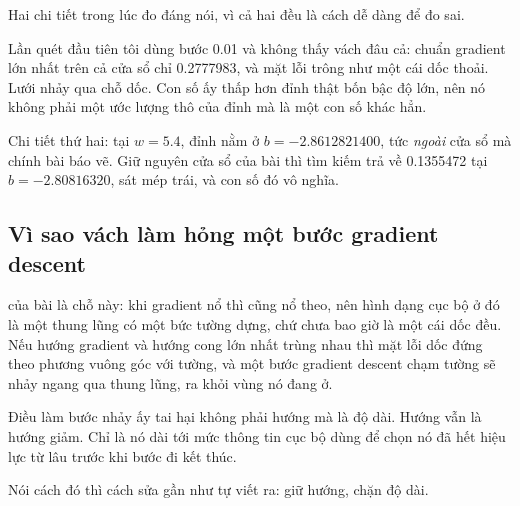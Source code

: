 Hai chi tiết trong lúc đo đáng nói, vì cả hai đều là cách dễ dàng để đo sai.

Lần quét đầu tiên tôi dùng bước 0.01 và không thấy vách đâu cả: chuẩn gradient
lớn nhất trên cả cửa sổ chỉ 0.2777983, và mặt lỗi trông như một cái dốc thoải.
Lưới nhảy qua chỗ dốc. Con số ấy thấp hơn đỉnh thật bốn bậc độ lớn, nên nó không
phải một ước lượng thô của đỉnh mà là một con số khác hẳn.

Chi tiết thứ hai: tại \(w = 5.4\), đỉnh nằm ở \(b = -2.8612821400\), tức
\emph{ngoài} cửa sổ mà chính bài báo vẽ. Giữ nguyên cửa sổ của bài thì tìm kiếm
trả về 0.1355472 tại \(b = -2.80816320\), sát mép trái, và con số đó vô nghĩa.

\subsection*{Vì sao vách làm hỏng một bước gradient descent}

%
 của bài là chỗ này: khi gradient nổ thì
 cũng
nổ theo, nên hình dạng cục bộ ở đó là một thung lũng có một bức tường dựng, chứ
chưa bao giờ là một cái dốc đều. Nếu hướng gradient và hướng cong lớn nhất trùng nhau thì mặt lỗi
dốc đứng theo phương vuông góc với tường, và một bước gradient descent chạm
tường sẽ nhảy ngang qua thung lũng, ra khỏi vùng nó đang ở.

Điều làm bước nhảy ấy tai hại không phải hướng mà là độ dài. Hướng vẫn là hướng
giảm. Chỉ là nó dài tới mức thông tin cục bộ dùng để chọn nó đã hết hiệu lực từ
lâu trước khi bước đi kết thúc.

Nói cách đó thì cách sửa gần như tự viết ra: giữ hướng, chặn độ dài.
